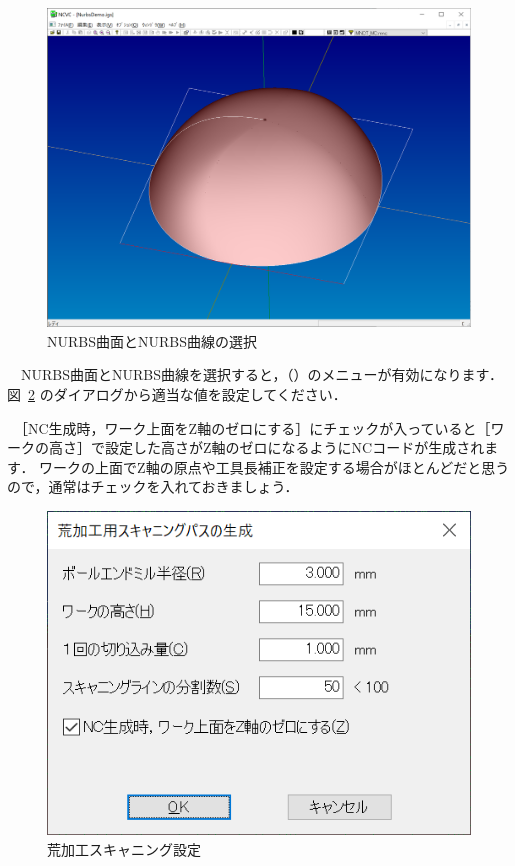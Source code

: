 \begin{figure}[H]
\centering
\includegraphics[scale=0.5]{No2/fig/fig22.png}
\caption{NURBS曲面とNURBS曲線の選択}
\label{fig:ncvc22}
\end{figure}

　NURBS曲面とNURBS曲線を選択すると，（）のメニューが有効になります．
図~\ref{fig:ncvc23} のダイアログから適当な値を設定してください．

　［NC生成時，ワーク上面をZ軸のゼロにする］にチェックが入っていると［ワークの高さ］で設定した高さがZ軸のゼロになるようにNCコードが生成されます．
ワークの上面でZ軸の原点や工具長補正を設定する場合がほとんどだと思うので，通常はチェックを入れておきましょう．

\begin{figure}[H]
\centering
\includegraphics{No2/fig/fig23.png}
\caption{荒加工スキャニング設定}
\label{fig:ncvc23}
\end{figure}

